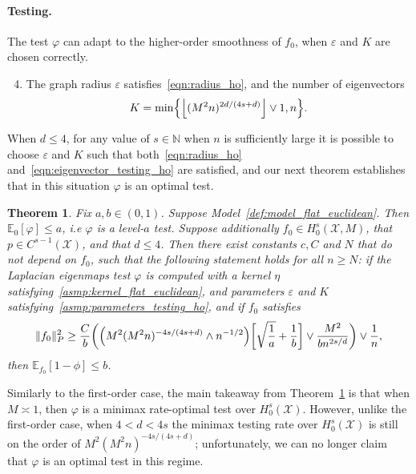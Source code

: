 \documentclass{article}
\newcommand{\floor}[1]{\left\lfloor #1 \right\rfloor}
\newcommand{\1}{\mathbf{1}}
\newcommand{\mc}[1]{\mathcal{#1}}
\newcommand{\Ebb}{\mathbb{E}}
\theoremstyle{alden}
\theoremstyle{aldenthm}
\newtheorem{theorem}{Theorem}
\theoremstyle{definition}
\theoremstyle{remark}
\begin{document}
\paragraph{Testing.} The test $\varphi$ can adapt to the higher-order smoothness of $f_0$, when $\varepsilon$ and $K$ are chosen correctly.
\begin{enumerate}[label=(P\arabic*)]
	\setcounter{enumi}{3}
	\item 
	\label{asmp:parameters_testing_ho}
	The graph radius $\varepsilon$ satisfies~\eqref{eqn:radius_ho}, and the number of eigenvectors
	\begin{equation}
	\label{eqn:eigenvector_testing_ho}
	K = \min\Bigl\{\floor{(M^2n)^{2d/(4s + d)}} \vee 1, n\Bigr\}.
	\end{equation}
\end{enumerate}
When $d \leq 4$, for any value of $s \in \mathbb{N}$ when $n$ is sufficiently large it is possible to choose $\varepsilon$ and $K$ such that both~\eqref{eqn:radius_ho} and~\eqref{eqn:eigenvector_testing_ho} are satisfied, and our next theorem establishes that in this situation $\varphi$ is an optimal test.
\begin{theorem}
	\label{thm:laplacian_eigenmaps_testing_ho}
	Fix $a,b \in (0,1)$. Suppose Model~\ref{def:model_flat_euclidean}. Then $\mathbb{E}_0[\varphi] \leq a$, i.e $\varphi$ is a level-$a$ test. Suppose additionally $f_0 \in H_0^s(\mc{X},M)$, that $p \in C^{s-1}(\mc{X})$, and that $d \leq 4$. Then there exist constants $c,C$ and $N$ that do not depend on $f_0$, such that the following statement holds for all $n \geq N$: if the Laplacian eigenmaps test $\varphi$ is computed with a kernel $\eta$ satisfying~\ref{asmp:kernel_flat_euclidean}, and parameters $\varepsilon$ and $K$ satisfying~\ref{asmp:parameters_testing_ho}, and if $f_0$ satisfies
	\begin{equation}
	\label{eqn:laplacian_eigenmaps_testing_criticalradius_ho}
	\|f_0\|_P^2 \geq \frac{C}{b}\biggl(\Bigl(M^2(M^2n)^{-4s/(4s + d) } \wedge n^{-1/2}\Bigr)\biggl[\sqrt{\frac{1}{a}} + \frac{1}{b}\biggr] \vee \frac{M^2}{b n^{2s/d}} \biggr) \vee \frac{1}{n},
	\end{equation}
	then $\Ebb_{f_0}[1 - \phi] \leq b$.
\end{theorem}
Similarly to the first-order case, the main takeaway from Theorem~\ref{thm:laplacian_eigenmaps_testing_ho} is that when $M \asymp 1$, then $\varphi$ is a minimax rate-optimal test over $H_0^s(\mc{X})$. However, unlike the first-order case, when $4 < d < 4s$ the minimax testing rate over $H_0^s(\mc{X})$ is still on the order of $M^2(M^2n)^{-4s/(4s + d)}$; unfortunately, we can no longer claim that $\varphi$ is an optimal test in this regime.
\end{document}
